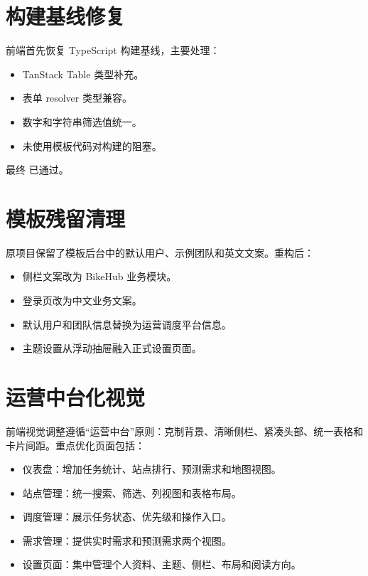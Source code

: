 
\section{构建基线修复}

前端首先恢复 TypeScript 构建基线，主要处理：

\begin{itemize}
  \item TanStack Table  类型补充。
  \item 表单 resolver 类型兼容。
  \item 数字和字符串筛选值统一。
  \item 未使用模板代码对构建的阻塞。
\end{itemize}

最终  已通过。

\section{模板残留清理}

原项目保留了模板后台中的默认用户、示例团队和英文文案。重构后：

\begin{itemize}
  \item 侧栏文案改为 BikeHub 业务模块。
  \item 登录页改为中文业务文案。
  \item 默认用户和团队信息替换为运营调度平台信息。
  \item 主题设置从浮动抽屉融入正式设置页面。
\end{itemize}

\section{运营中台化视觉}

前端视觉调整遵循“运营中台”原则：克制背景、清晰侧栏、紧凑头部、统一表格和卡片间距。重点优化页面包括：

\begin{itemize}
  \item 仪表盘：增加任务统计、站点排行、预测需求和地图视图。
  \item 站点管理：统一搜索、筛选、列视图和表格布局。
  \item 调度管理：展示任务状态、优先级和操作入口。
  \item 需求管理：提供实时需求和预测需求两个视图。
  \item 设置页面：集中管理个人资料、主题、侧栏、布局和阅读方向。
\end{itemize}

